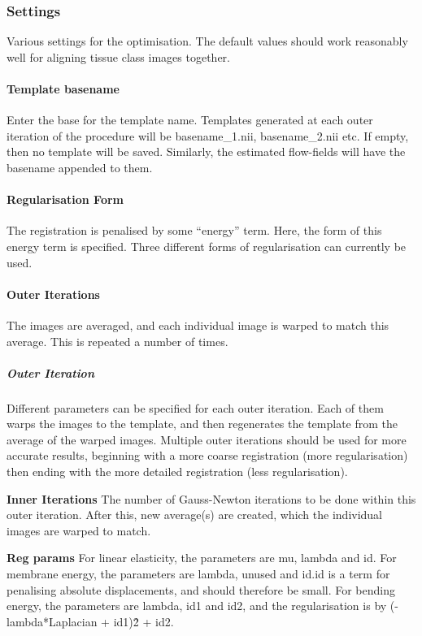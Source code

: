 \subsubsection{Settings}
Various settings for the optimisation. The default values should work reasonably well for aligning tissue class images together.


\paragraph{Template basename}
Enter the base for the template name.  Templates generated at each outer iteration of the procedure will be basename\_1.nii, basename\_2.nii etc.  If empty, then no template will be saved. Similarly, the estimated flow-fields will have the basename appended to them.


\paragraph{Regularisation Form}
The registration is penalised by some ``energy'' term.  Here, the form of this energy term is specified. Three different forms of regularisation can currently be used.


\paragraph{Outer Iterations}
The images are averaged, and each individual image is warped to match this average.  This is repeated a number of times.


\subparagraph{Outer Iteration}
Different parameters can be specified for each outer iteration. Each of them warps the images to the template, and then regenerates the template from the average of the warped images. Multiple outer iterations should be used for more accurate results, beginning with a more coarse registration (more regularisation) then ending with the more detailed registration (less regularisation).


\textbf{Inner Iterations}
The number of Gauss-Newton iterations to be done within this outer iteration. After this, new average(s) are created, which the individual images are warped to match.


\textbf{Reg params}
For linear elasticity, the parameters are mu, lambda and id. For membrane energy, the parameters are lambda, unused and id.id is a term for penalising absolute displacements, and should therefore be small.  For bending energy, the parameters are lambda, id1 and id2, and the regularisation is by (-lambda*Laplacian + id1)\^2 + id2.


